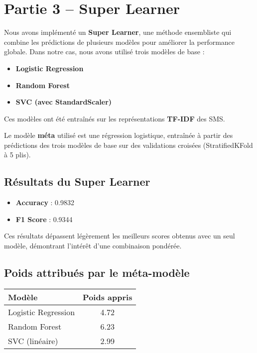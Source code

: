 
\section*{Partie 3 – Super Learner}

Nous avons implémenté un \textbf{Super Learner}, une méthode ensembliste qui combine les prédictions de plusieurs modèles pour améliorer la performance globale. Dans notre cas, nous avons utilisé trois modèles de base :
\begin{itemize}
    \item \textbf{Logistic Regression}
    \item \textbf{Random Forest}
    \item \textbf{SVC (avec StandardScaler)}
\end{itemize}

Ces modèles ont été entraînés sur les représentations \textbf{TF-IDF} des SMS.

Le modèle \textbf{méta} utilisé est une régression logistique, entraînée à partir des prédictions des trois modèles de base sur des validations croisées (StratifiedKFold à 5 plis).

\subsection*{Résultats du Super Learner}
\begin{itemize}
    \item \textbf{Accuracy} : 0.9832
    \item \textbf{F1 Score} : 0.9344
\end{itemize}

Ces résultats dépassent légèrement les meilleurs scores obtenus avec un seul modèle, démontrant l’intérêt d’une combinaison pondérée.

\subsection*{Poids attribués par le méta-modèle}
\begin{center}
\begin{tabular}{|l|c|}
\hline
\textbf{Modèle} & \textbf{Poids appris} \\
\hline
Logistic Regression & 4.72 \\
Random Forest & 6.23 \\
SVC (linéaire) & 2.99 \\
\hline
\end{tabular}
\end{center}

